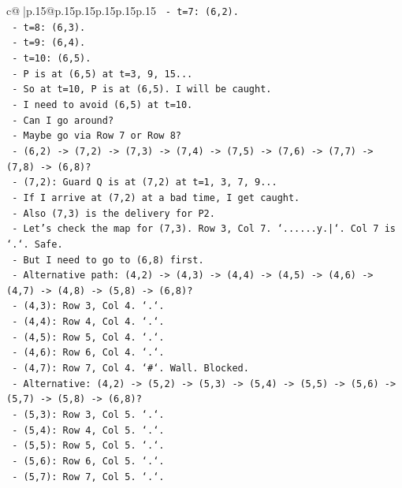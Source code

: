 \documentclass{article}
\begin{document}
{\begin{supertabular}{c@{$\;$}|p{.15\linewidth}@{}p{.15\linewidth}p{.15\linewidth}p{.15\linewidth}p{.15\linewidth}p{.15\linewidth}}
{{{\texttt{  {-} t=7: (6,2).} \\
\texttt{  {-} t=8: (6,3).} \\
\texttt{  {-} t=9: (6,4).} \\
\texttt{  {-} t=10: (6,5).} \\
\texttt{  {-} P is at (6,5) at t=3, 9, 15...} \\
\texttt{  {-} So at t=10, P is at (6,5). I will be caught.} \\
\texttt{  {-} I need to avoid (6,5) at t=10.} \\
\texttt{  {-} Can I go around?} \\
\texttt{  {-} Maybe go via Row 7 or Row 8?} \\
\texttt{  {-} (6,2) {-}> (7,2) {-}> (7,3) {-}> (7,4) {-}> (7,5) {-}> (7,6) {-}> (7,7) {-}> (7,8) {-}> (6,8)?} \\
\texttt{    {-} (7,2): Guard Q is at (7,2) at t=1, 3, 7, 9...} \\
\texttt{    {-} If I arrive at (7,2) at a bad time, I get caught.} \\
\texttt{    {-} Also (7,3) is the delivery for P2.} \\
\texttt{    {-} Let's check the map for (7,3). Row 3, Col 7. `......y.|`. Col 7 is `.`. Safe.} \\
\texttt{    {-} But I need to go to (6,8) first.} \\
\texttt{  {-} Alternative path: (4,2) {-}> (4,3) {-}> (4,4) {-}> (4,5) {-}> (4,6) {-}> (4,7) {-}> (4,8) {-}> (5,8) {-}> (6,8)?} \\
\texttt{    {-} (4,3): Row 3, Col 4. `.`.} \\
\texttt{    {-} (4,4): Row 4, Col 4. `.`.} \\
\texttt{    {-} (4,5): Row 5, Col 4. `.`.} \\
\texttt{    {-} (4,6): Row 6, Col 4. `.`.} \\
\texttt{    {-} (4,7): Row 7, Col 4. `\#`. Wall. Blocked.} \\
\texttt{  {-} Alternative: (4,2) {-}> (5,2) {-}> (5,3) {-}> (5,4) {-}> (5,5) {-}> (5,6) {-}> (5,7) {-}> (5,8) {-}> (6,8)?} \\
\texttt{    {-} (5,3): Row 3, Col 5. `.`.} \\
\texttt{    {-} (5,4): Row 4, Col 5. `.`.} \\
\texttt{    {-} (5,5): Row 5, Col 5. `.`.} \\
\texttt{    {-} (5,6): Row 6, Col 5. `.`.} \\
\texttt{    {-} (5,7): Row 7, Col 5. `.`.} \\
}}}
\end{supertabular}}
\end{document}
